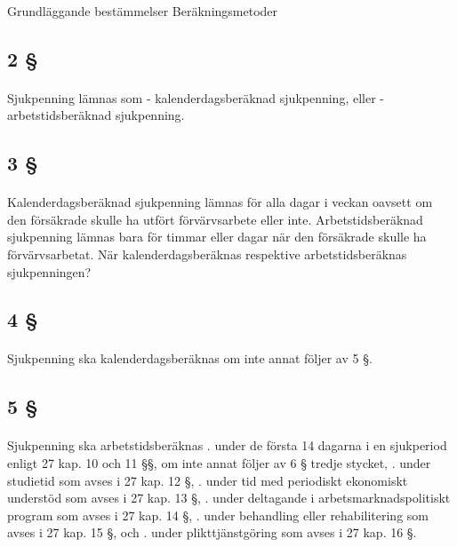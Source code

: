 \documentclass[a4paper,notitlepage,openany,10pt]{book}
\begin{document}
\paragraph*{}
Grundläggande bestämmelser Beräkningsmetoder
\subsection*{2 §}
\paragraph*{}
Sjukpenning lämnas som
\newline - kalenderdagsberäknad sjukpenning, eller
\newline - arbetstidsberäknad sjukpenning.
\subsection*{3 §}
\paragraph*{}
Kalenderdagsberäknad sjukpenning lämnas för alla dagar i veckan oavsett om den försäkrade skulle ha utfört förvärvsarbete eller inte.
Arbetstidsberäknad sjukpenning lämnas bara för timmar eller dagar när den försäkrade skulle ha förvärvsarbetat.
När kalenderdagsberäknas respektive arbetstidsberäknas sjukpenningen?
\subsection*{4 §}
\paragraph*{}
Sjukpenning ska kalenderdagsberäknas om inte annat följer av 5 §.
\subsection*{5 §}
\paragraph*{}
Sjukpenning ska arbetstidsberäknas
. under de första 14 dagarna i en sjukperiod enligt 27 kap. 10 och 11 §§, om inte annat följer av 6 § tredje stycket,
. under studietid som avses i 27 kap. 12 §,
. under tid med periodiskt ekonomiskt understöd som avses i 27 kap. 13 §,
. under deltagande i arbetsmarknadspolitiskt program som avses i 27 kap. 14 §,
. under behandling eller rehabilitering som avses i 27 kap. 15 §, och
. under plikttjänstgöring som avses i 27 kap. 16 §.
\end{document}
